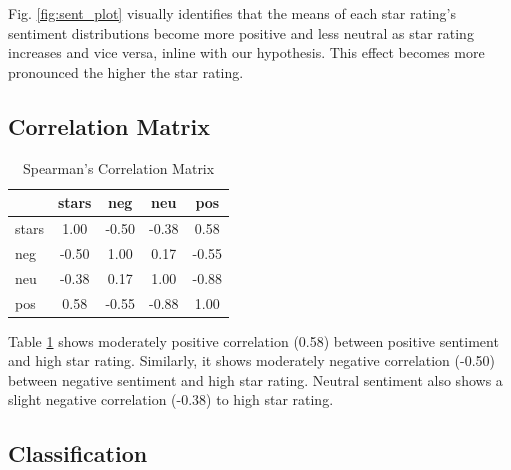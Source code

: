 \documentclass[sn-mathphys,Numbered]{sn-jnl}%
\theoremstyle{thmstyleone}%
\theoremstyle{thmstyletwo}%
\theoremstyle{thmstylethree}%
\begin{document}
Fig. \ref{fig:sent_plot} visually identifies that the means of each star rating's sentiment distributions become more positive and less neutral as star rating increases and vice versa, inline with our hypothesis. This effect becomes more pronounced the higher the star rating.

\subsection{Correlation Matrix}
\begin{table}[h!]
\centering
\begin{tabular}{l|cccc}
           & stars     & neg       & neu       & pos       \\ \hline
stars & 1.00 & -0.50 & -0.38 & 0.58 \\
neg & -0.50 & 1.00 & 0.17 & -0.55 \\
neu & -0.38 & 0.17 & 1.00 & -0.88 \\
pos & 0.58 & -0.55 & -0.88 & 1.00 \\
\end{tabular}
\caption{Spearman's Correlation Matrix}
\label{tab:spearman_correlation}
\end{table}

Table \ref{tab:spearman_correlation} shows moderately positive correlation (0.58) between positive sentiment and high star rating. Similarly, it shows moderately negative correlation (-0.50) between negative sentiment and high star rating. Neutral sentiment also shows a slight negative correlation (-0.38) to high star rating. 

\subsection{Classification}
\end{document}
